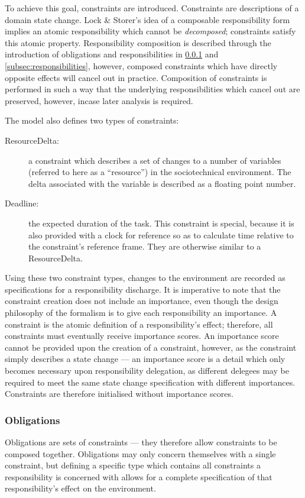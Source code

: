 To achieve this goal, constraints are introduced. Constraints are descriptions of a domain state change. Lock \& Storer's idea of a composable responsibility form implies an atomic responsibility which cannot be \emph{decomposed}; constraints satisfy this atomic property. Responsibility composition is described through the introduction of obligations and responsibilities in \cref{subsec:obligations} and \cref{subsec:responsibilities}, however, composed constraints which have directly opposite effects will cancel out in practice. Composition of constraints is performed in such a way that the underlying responsibilities which cancel out are preserved, however, incase later analysis is required.\par

The model also defines two types of constraints:

\begin{description}
    \item [ResourceDelta: ] a constraint which describes a set of changes to a number of variables (referred to here as a ``resource'') in the sociotechnical environment. The delta associated with the variable is described as a floating point number.
    \item [Deadline: ] the expected duration of the task. This constraint is special, because it is also provided with a clock for reference so as to calculate time relative to the constraint's reference frame. They are otherwise similar to a ResourceDelta.
\end{description}

Using these two constraint types, changes to the environment are recorded as specifications for a responsibility discharge. It is imperative to note that the constraint creation does not include an importance, even though the design philosophy of the formalism is to give each responsibility an importance. A constraint is the atomic definition of a responsibility's effect; therefore, all constraints must eventually receive importance scores. An importance score cannot be provided upon the creation of a constraint, however, as the constraint simply describes a state change --- an importance score is a detail which only becomes necessary upon responsibility delegation, as different delegees may be required to meet the same state change specification with different importances. Constraints are therefore initialised without importance scores.\par

\subsubsection{Obligations}\label{subsec:obligations}  %
Obligations are sets of constraints --- they therefore allow constraints to be composed together. Obligations may only concern themselves with a single constraint, but defining a specific type which contains all constraints a responsibility is concerned with allows for a complete specification of that responsibility's effect on the environment.\par

